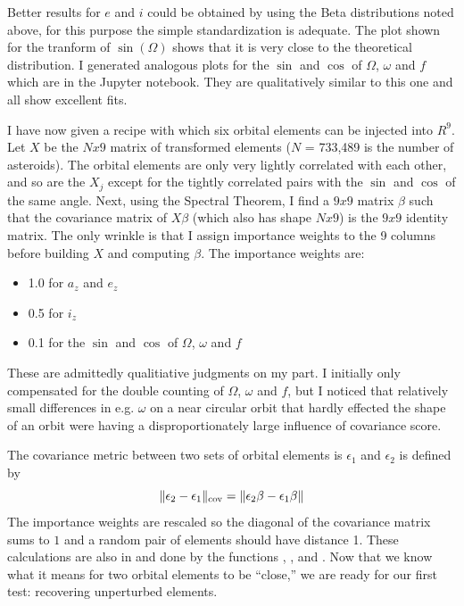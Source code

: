 Better results for $e$ and $i$ could be obtained by using the Beta distributions noted above, for this purpose the simple standardization is adequate.
The plot shown for the tranform of $\sin(\Omega)$ shows that it is very close to the theoretical distribution.
I generated analogous plots for the $\sin$ and $\cos$ of $\Omega$, $\omega$ and $f$ which are in the Jupyter notebook.
They are qualitatively similar to this one and all show excellent fits.

I have now given a recipe with which six orbital elements can be injected into $R^{9}$.
Let $X$ be the $N x 9$ matrix of transformed elements ($N$ = 733,489 is the number of asteroids).
The orbital elements are only very lightly correlated with each other, 
and so are the $X_j$ except for the tightly correlated pairs with the $\sin$ and $\cos$ of the same angle.
Next, using the Spectral Theorem, I find a $9x9$ matrix $\beta$ such that the covariance matrix of $X \beta$  
(which also has shape $N x 9$) is the $9x9$ identity matrix.
The only wrinkle is that I assign importance weights to the 9 columns before building $X$ and computing $\beta$.
The importance weights are:
\begin{itemize}
\item 1.0 for $a_z$ and $e_z$
\item 0.5 for $i_z$
\item 0.1 for the $\sin$ and $\cos$ of $\Omega$, $\omega$ and $f$
\end{itemize}
These are admittedly qualitiative judgments on my part. 
I initially only compensated for the double counting of $\Omega$, $\omega$ and $f$, 
but I noticed that relatively small differences in e.g. $\omega$ on a near circular orbit that hardly effected the shape of an orbit
were having a disproportionately large influence of covariance score.

The covariance metric between two sets of orbital elements is $\epsilon_1$ and $\epsilon_2$ is defined by
$$ \lVert\epsilon_2 - \epsilon_1\rVert_{\mathrm{cov}} = \lVert\epsilon_2 \beta - \epsilon_1 \beta\rVert $$
The importance weights are rescaled so the diagonal of the covariance matrix sums to $1$ and a random pair of elements should have distance 1.
These calculations are also in  and done by the 
functions , ,  and .
Now that we know what it means for two orbital elements to be ``close,'' 
we are ready for our first test: recovering unperturbed elements.

